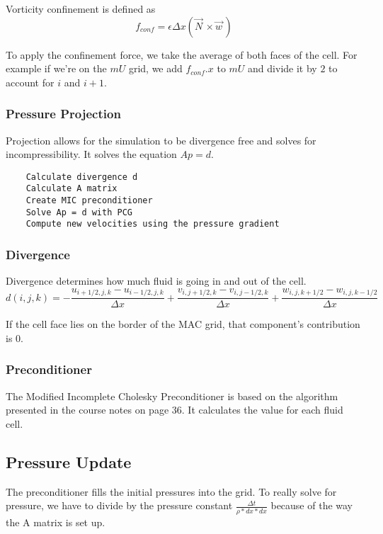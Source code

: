 \documentclass[a4paper]{article}
\begin{document}
    \noindent Vorticity confinement is defined as
    \[ f_{conf} = \epsilon \Delta x(\vec{N}^{\,} \times \vec{w}^{\,}) \]
    
    \noindent To apply the confinement force, we take the average of both faces of the cell. For example if we're on the $ mU $ grid, we add $ f_{conf}.x $ to $ mU $ and divide it by $ 2 $ to account for $ i $ and $ i + 1 $.
    
    \subsubsection{Pressure Projection}
    Projection allows for the simulation to be divergence free and solves for incompressibility. It solves the equation $ Ap = d $.
    
    \begin{lstlisting}
    Calculate divergence d
    Calculate A matrix
    Create MIC preconditioner
    Solve Ap = d with PCG
    Compute new velocities using the pressure gradient
    \end{lstlisting}
    
    \subsubsection*{Divergence}
    Divergence determines how much fluid is going in and out of the cell. 
    \[ d(i, j, k) = -\frac{u_{i+1/2,j,k} - u_{i - 1/2,j,k}}{\Delta x} + \frac{v_{i,j+1/2,k} - v_{i,j-1/2,k}}{\Delta x} + \frac{w_{i,j,k+1/2} - w_{i,j,k-1/2}}{\Delta x} \]
    
    \noindent If the cell face lies on the border of the MAC grid, that component's contribution is 0.
    
    \subsubsection*{Preconditioner}
    The Modified Incomplete Cholesky Preconditioner is based on the algorithm presented in the course notes on page 36. It calculates the value for each fluid cell.
    
    \subsection*{Pressure Update}
    The preconditioner fills the initial pressures into the grid. To really solve for pressure, we have to divide by the pressure constant $ \frac{\Delta t}{\rho * dx * dx} $ because of the way the A matrix is set up.
    
\end{document}
